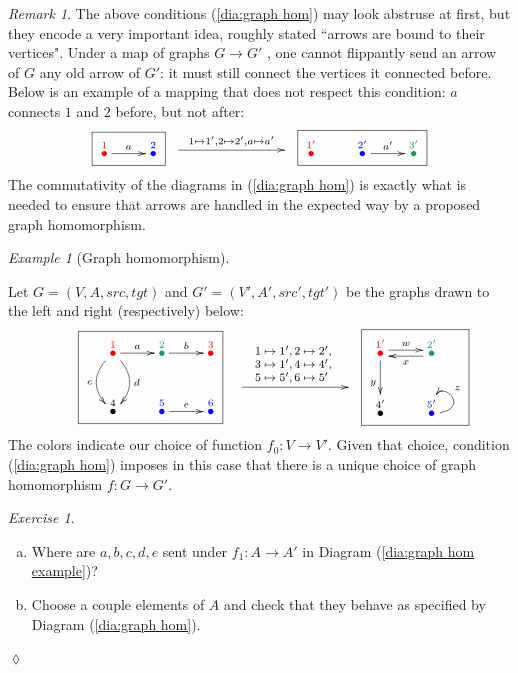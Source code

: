 \documentclass{book}
\def\hsp{\hspace{.3in}}
\def\to{\rightarrow}
\def\taking{\colon}
\newcommand{\LMO}[1]{\stackrel{#1}{\bullet}}
\theoremstyle{remark}
\newtheorem{remark}[subsubsection]{Remark}
\newtheorem{example}[subsubsection]{Example}
\newtheorem{exc}[subsubsection]{Exercise}
\newenvironment{exercise}{\begin{exc}}{\hspace*{\fill}$\lozenge$\end{exc}}
\theoremstyle{definition}
\def\sexc{\begin{enumerate}[a.)]\setlength{\itemsep}{.1cm}\setlength{\parskip}{.1cm}\item}
\def\next{\item}
\def\endsexc{\end{enumerate}}
\begin{document}
\begin{remark}

The above conditions (\ref{dia:graph hom}) may look abstruse at first, but they encode a very important idea, roughly stated ``arrows are bound to their vertices". Under a map of graphs $G\to G'$ , one cannot flippantly send an arrow of $G$ any old arrow of $G'$: it must still connect the vertices it connected before. Below is an example of a mapping that does not respect this condition: $a$ connects $1$ and $2$ before, but not after:
$$
\fbox{\xymatrix{\LMO{\color{red}{1}}\ar[r]^{a}&\LMO{\color{blue}{2}}}}
\xymatrix{~\ar[rr]^{1\mapsto 1',2\mapsto 2', a\mapsto a'}&\hsp&~}
\fbox{\xymatrix{\LMO{\color{red}{1'}}&\LMO{\color{blue}{2'}}\ar[r]^{a'}&\LMO{\color{ForestGreen}{3'}}}}
$$
The commutativity of the diagrams in (\ref{dia:graph hom}) is exactly what is needed to ensure that arrows are handled in the expected way by a proposed graph homomorphism.
 
\end{remark}

\begin{example}[Graph homomorphism]\label{ex:graph hom}

Let $G=(V,A,src,tgt)$ and $G'=(V',A',src',tgt')$ be the graphs drawn to the left and right (respectively) below:
\begin{align}\label{dia:graph hom example}
\parbox{1.5in}{\fbox{\xymatrix{\LMO{\color{red}{1}}\ar[r]^a\ar@/^1pc/[d]^d\ar@/_1pc/[d]_c&\LMO{\color{ForestGreen}{2}}\ar[r]^b&\LMO{\color{red}{3}}\\\LMO{4}&\LMO{\color{blue}{5}}\ar[r]^e&\LMO{\color{blue}{6}}}}}
\parbox{1in}{\xymatrix{~\ar[rr]^{\parbox{.8in}{\vspace{-.2in}\footnotesize$1\mapsto 1', 2\mapsto 2',\\ 3\mapsto 1',4\mapsto 4',\\ 5\mapsto 5',6\mapsto5'$}}&\hsp&~}}
\parbox{.8in}{\fbox{\xymatrix{\LMO{\color{red}{1'}}\ar@<.5ex>[r]^w\ar[d]_y&\LMO{\color{ForestGreen}{2'}}\ar@<.5ex>[l]^x\\\LMO{4'}&\LMO{\color{blue}{5'}}\ar@(r,u)[]_z}}}
\end{align}
The colors indicate our choice of function $f_0\taking V\to V'$. Given that choice, condition (\ref{dia:graph hom}) imposes in this case that there is a unique choice of graph homomorphism $f\taking G\to G'$. 

\end{example}

\begin{exercise}~
\sexc Where are $a,b,c,d,e$ sent under $f_1\taking A\to A'$ in Diagram (\ref{dia:graph hom example})? 
\next Choose a couple elements of $A$ and check that they behave as specified by Diagram (\ref{dia:graph hom}).
\endsexc
\end{exercise}
\end{document}
